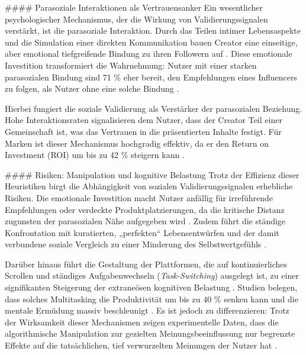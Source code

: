 \documentclass[11pt,a4paper]{article}
\begin{document}
\#\#\#\# Parasoziale Interaktionen als Vertrauensanker Ein wesentlicher psychologischer Mechanismus, der die Wirkung von Validierungssignalen verstärkt, ist die parasoziale Interaktion. Durch das Teilen intimer Lebensaspekte und die Simulation einer direkten Kommunikation bauen Creator eine einseitige, aber emotional tiefgreifende Bindung zu ihren Followern auf \autocite{grey_grey_5d5c282590c448fc8776b04f78a08de5}. Diese emotionale Investition transformiert die Wahrnehmung: Nutzer mit einer starken parasozialen Bindung sind 71 \% eher bereit, den Empfehlungen eines Influencers zu folgen, als Nutzer ohne eine solche Bindung \autocite{grey_grey_5d5c282590c448fc8776b04f78a08de5}.

Hierbei fungiert die soziale Validierung als Verstärker der parasozialen Beziehung. Hohe Interaktionsraten signalisieren dem Nutzer, dass der Creator Teil einer Gemeinschaft ist, was das Vertrauen in die präsentierten Inhalte festigt. Für Marken ist dieser Mechanismus hochgradig effektiv, da er den Return on Investment (ROI) um bis zu 42 \% steigern kann \autocite{grey_grey_5d5c282590c448fc8776b04f78a08de5}.

\#\#\#\# Risiken: Manipulation und kognitive Belastung Trotz der Effizienz dieser Heuristiken birgt die Abhängigkeit von sozialen Validierungssignalen erhebliche Risiken. Die emotionale Investition macht Nutzer anfällig für irreführende Empfehlungen oder verdeckte Produktplatzierungen, da die kritische Distanz zugunsten der parasozialen Nähe aufgegeben wird \autocite{grey_grey_5d5c282590c448fc8776b04f78a08de5}. Zudem führt die ständige Konfrontation mit kuratierten, „perfekten“ Lebensentwürfen und der damit verbundene soziale Vergleich zu einer Minderung des Selbstwertgefühls \autocite{grey_grey_3467cac0f11d4b1e86319128da218a3e,grey_grey_f99abd6bfbd04efc8def60bb6988ce35,grey_grey_8407dc6841b0415a989fd351e0065df0}.

Darüber hinaus führt die Gestaltung der Plattformen, die auf kontinuierliches Scrollen und ständiges Aufgabenwechseln (\textit{Task-Switching}) ausgelegt ist, zu einer signifikanten Steigerung der extraneösen kognitiven Belastung \autocite{grey_grey_d4bc9c0d0e8441ba90398520e73af07d}. Studien belegen, dass solches Multitasking die Produktivität um bis zu 40 \% senken kann und die mentale Ermüdung massiv beschleunigt \autocite{grey_grey_d4bc9c0d0e8441ba90398520e73af07d}. Es ist jedoch zu differenzieren: Trotz der Wirksamkeit dieser Mechanismen zeigen experimentelle Daten, dass die algorithmische Manipulation zur gezielten Meinungsbeeinflussung nur begrenzte Effekte auf die tatsächlichen, tief verwurzelten Meinungen der Nutzer hat \autocite{grey_grey_54e34d5df6ea4df2b6dbbe83e697dac1}.
\end{document}
